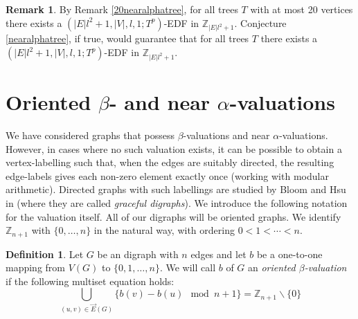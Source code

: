 \documentclass[12pt, a4paper]{article}
\theoremstyle{definition}
\newtheorem{definition}[theorem]{Definition}
\newtheorem{remark}[theorem]{Remark}
\begin{document}
\begin{remark}
By Remark \ref{20nearalphatree}, for all trees $T$ with at most 20 vertices there exists a $(|E|l^2 + 1, |V|, l, 1; T^p)$-EDF in $\mathbb{Z}_{|E|l^2+1}$. Conjecture \ref{nearalphatree}, if true, would guarantee that for all trees $T$ there exists a $(|E|l^2 + 1, |V|, l, 1; T^p)$-EDF in $\mathbb{Z}_{|E|l^2+1}$.
\end{remark}



\section{Oriented $\beta$- and near $\alpha$-valuations}

We have considered graphs that possess $\beta$-valuations and near $\alpha$-valuations. However, in cases where no such valuation exists, it can be possible to obtain a vertex-labelling such that, when the edges are suitably directed, the resulting edge-labels gives each non-zero element exactly once (working with modular arithmetic). Directed graphs with such labellings are studied by Bloom and Hsu in \cite{BloHsu} (where they are called \emph{graceful digraphs}).  We introduce the following notation for the valuation itself.  All of our digraphs will be oriented graphs. We identify $\mathbb{Z}_{n+1}$ with $\{0,\ldots,n\}$
in the natural way, with ordering $0<1< \cdots<n$.

\begin{definition}
Let $G$ be an digraph with $n$ edges and let $b$ be a one-to-one mapping from $V(G)$ to $\{0,1,\ldots,n\}$. We will call $b$ of $G$ an \emph{oriented $\beta$-valuation} if the following multiset equation holds:
    \[\bigcup_{(u,v) \in \overrightarrow{E}(G)} \{ b(v)-b(u) \mod n+1\} = \mathbb{Z}_{n+1}\backslash\{0\}\]
\end{definition}
\end{document}
